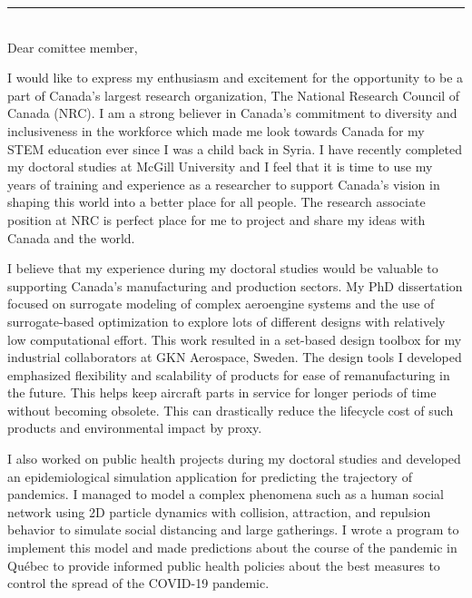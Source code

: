 \documentclass[12pt]{article} %
\begin{document}
\begin{paracol}{2}
\end{paracol}

\medskip %
\rule[0pt]{\textwidth}{1pt}\\

Dear comittee member,

\medskip %
I would like to express my enthusiasm and excitement for the opportunity to be a part of Canada's largest research organization, The National Research Council of Canada (NRC). I am a strong believer in Canada's commitment to diversity and inclusiveness in the workforce which made me look towards Canada for my STEM education ever since I was a child back in Syria. I have recently completed my doctoral studies at McGill University and I feel that it is time to use my years of training and experience as a researcher to support Canada's vision in shaping this world into a better place for all people. The research associate position at NRC is perfect place for me to project and share my ideas with Canada and the world.

\medskip %

I believe that my experience during my doctoral studies would be valuable to supporting Canada's manufacturing and production sectors. My PhD dissertation focused on surrogate modeling of complex aeroengine systems and the use of surrogate-based optimization to explore lots of different designs with relatively low computational effort. This work resulted in a set-based design toolbox for my industrial collaborators at GKN Aerospace, Sweden. The design tools I developed emphasized flexibility and scalability of products for ease of remanufacturing in the future. This helps keep aircraft parts in service for longer periods of time without becoming obsolete. This can drastically reduce the lifecycle cost of such products and environmental impact by proxy.

\medskip %

I also worked on public health projects during my doctoral studies and developed an epidemiological simulation application for predicting the trajectory of pandemics. I managed to model a complex phenomena such as a human social network using 2D particle dynamics with collision, attraction, and repulsion behavior to simulate social distancing and large gatherings. I wrote a program to implement this model and made predictions about the course of the pandemic in Qu{\'e}bec to provide informed public health policies about the best measures to control the spread of the COVID-19 pandemic.
\end{document}
